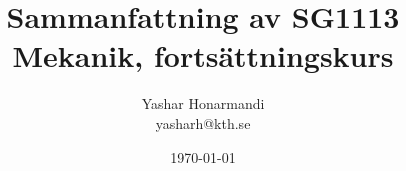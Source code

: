 \documentclass[a4paper, 11pt]{article}
\title{Sammanfattning av SG1113 Mekanik, fortsättningskurs}
\author{Yashar Honarmandi \\ yasharh@kth.se}
\date{\today}
\begin{document}
\maketitle

\begin{abstract}
	
\end{abstract}

\thispagestyle{empty}

\newpage

\tableofcontents

\newpage











\end{document}
